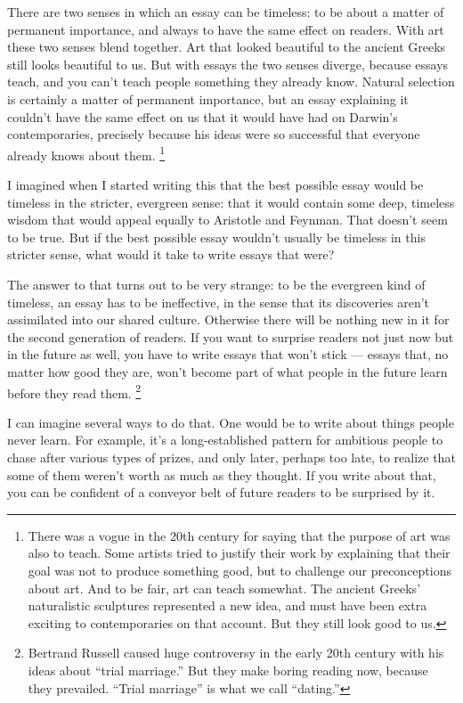 There are two senses in which an essay can be timeless: to be about a
matter of permanent importance, and always to have the same effect on
readers. With art these two senses blend together. Art that looked
beautiful to the ancient Greeks still looks beautiful to us. But with
essays the two senses diverge, because essays teach, and you can't teach
people something they already know. Natural selection is certainly a
matter of permanent importance, but an essay explaining it couldn't have
the same effect on us that it would have had on Darwin's contemporaries,
precisely because his ideas were so successful that everyone already
knows about them. \footnote{There was a vogue in the 20th century for saying that the
purpose of art was also to teach. Some artists tried to justify their
work by explaining that their goal was not to produce something good,
but to challenge our preconceptions about art. And to be fair, art can
teach somewhat. The ancient Greeks' naturalistic sculptures represented
a new idea, and must have been extra exciting to contemporaries on that
account. But they still look good to us.}

I imagined when I started writing this that the best possible essay
would be timeless in the stricter, evergreen sense: that it would
contain some deep, timeless wisdom that would appeal equally to
Aristotle and Feynman. That doesn't seem to be true. But if the best
possible essay wouldn't usually be timeless in this stricter sense, what
would it take to write essays that were?

The answer to that turns out to be very strange: to be the evergreen
kind of timeless, an essay has to be ineffective, in the sense that its
discoveries aren't assimilated into our shared culture. Otherwise there
will be nothing new in it for the second generation of readers. If you
want to surprise readers not just now but in the future as well, you
have to write essays that won't stick --- essays that, no matter how
good they are, won't become part of what people in the future learn
before they read them. \footnote{Bertrand Russell caused huge controversy in the early 20th
century with his ideas about ``trial marriage.'' But they make boring
reading now, because they prevailed. ``Trial marriage'' is what we call
``dating.''}

I can imagine several ways to do that. One would be to write about
things people never learn. For example, it's a long-established pattern
for ambitious people to chase after various types of prizes, and only
later, perhaps too late, to realize that some of them weren't worth as
much as they thought. If you write about that, you can be confident of a
conveyor belt of future readers to be surprised by it.

